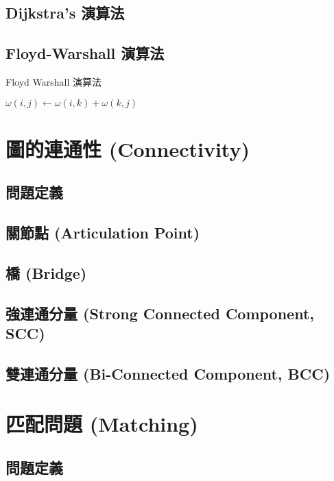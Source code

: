 \subsection{Dijkstra's 演算法}

\subsection{Floyd-Warshall 演算法}

\begin{algorithm}
\label{algo-floyd-warshall}
\caption{Floyd Warshall 演算法}
\begin{algorithmic}[1]
          \State $\omega{(i,j)}\gets{\omega{(i,k)}+\omega{(k,j)}}$
        \EndIf
      \EndFor
    \EndFor
  \EndFor
\EndProcedure
\end{algorithmic}
\end{algorithm}

\section{圖的連通性 (Connectivity)}
\subsection{問題定義}
\subsection{關節點 (Articulation Point)}
\subsection{橋 (Bridge)}
\subsection{強連通分量 (Strong Connected Component, SCC)}
\subsection{雙連通分量 (Bi-Connected Component, BCC)}

\section{匹配問題 (Matching)}
\subsection{問題定義}
